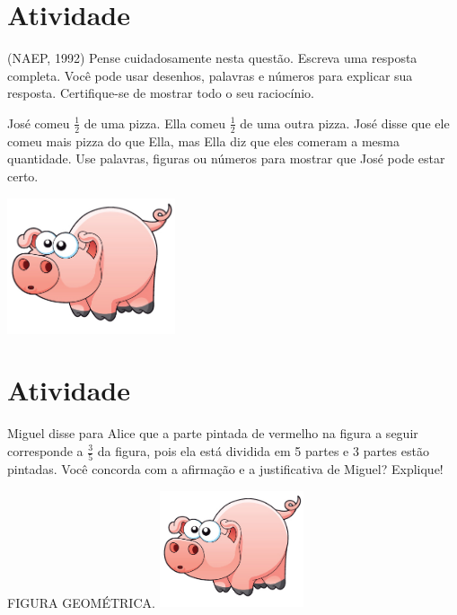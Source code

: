 \documentclass[a4,12pt]{book}
\begin{document}
\section{Atividade}







(NAEP, 1992) Pense cuidadosamente nesta questão. Escreva uma resposta completa. Você pode usar desenhos, palavras e números para explicar sua resposta. Certifique-se de mostrar todo o seu raciocínio.

José comeu $\frac{1}{2}$ de uma pizza. Ella comeu $\frac{1}{2}$ de uma outra pizza. José disse que ele comeu mais pizza do que Ella, mas Ella diz que eles comeram a mesma quantidade. Use palavras, figuras ou números para mostrar que José pode estar certo.





\includegraphics[width=\textwidth,height=4cm, keepaspectratio]{pig}
\section{Atividade}







Miguel disse para Alice que a parte pintada de vermelho na figura a seguir corresponde a $\frac{3}{5}$ da figura, pois ela está dividida em 5 partes e 3 partes estão pintadas. Você concorda com a afirmação e a justificativa de Miguel? Explique!
\begin{imagem*}[breakable]{}{}   FIGURA GEOMÉTRICA.  
    \includegraphics[width=120pt, keepaspectratio]{pig}  
\end{imagem*}
\end{document}
